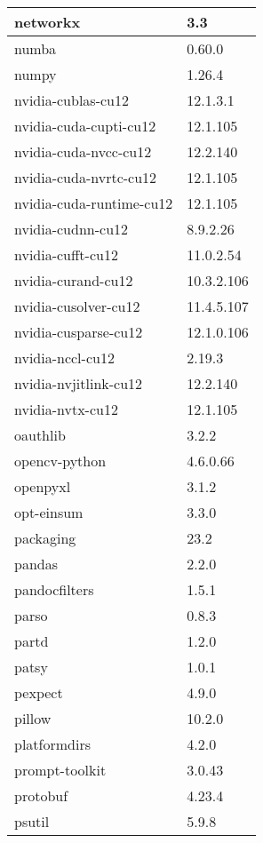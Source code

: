 \begin{longtable}{|l|l|}
	networkx             & 3.3 \\ \hline
	numba                & 0.60.0 \\ \hline
	numpy                & 1.26.4 \\ \hline
	nvidia-cublas-cu12   & 12.1.3.1 \\ \hline
	nvidia-cuda-cupti-cu12 & 12.1.105 \\ \hline
	nvidia-cuda-nvcc-cu12 & 12.2.140 \\ \hline
	nvidia-cuda-nvrtc-cu12 & 12.1.105 \\ \hline
	nvidia-cuda-runtime-cu12 & 12.1.105 \\ \hline
	nvidia-cudnn-cu12    & 8.9.2.26 \\ \hline
	nvidia-cufft-cu12    & 11.0.2.54 \\ \hline
	nvidia-curand-cu12   & 10.3.2.106 \\ \hline
	nvidia-cusolver-cu12 & 11.4.5.107 \\ \hline
	nvidia-cusparse-cu12 & 12.1.0.106 \\ \hline
	nvidia-nccl-cu12     & 2.19.3 \\ \hline
	nvidia-nvjitlink-cu12 & 12.2.140 \\ \hline
	nvidia-nvtx-cu12     & 12.1.105 \\ \hline
	oauthlib             & 3.2.2 \\ \hline
	opencv-python        & 4.6.0.66 \\ \hline
	openpyxl             & 3.1.2 \\ \hline
	opt-einsum           & 3.3.0 \\ \hline
	packaging            & 23.2 \\ \hline
	pandas               & 2.2.0 \\ \hline
	pandocfilters        & 1.5.1 \\ \hline
	parso                & 0.8.3 \\ \hline
	partd                & 1.2.0 \\ \hline
	patsy                & 1.0.1 \\ \hline
	pexpect              & 4.9.0 \\ \hline
	pillow               & 10.2.0 \\ \hline
	platformdirs         & 4.2.0 \\ \hline
	prompt-toolkit       & 3.0.43 \\ \hline
	protobuf             & 4.23.4 \\ \hline
	psutil               & 5.9.8 \\ \hline

\end{longtable}
